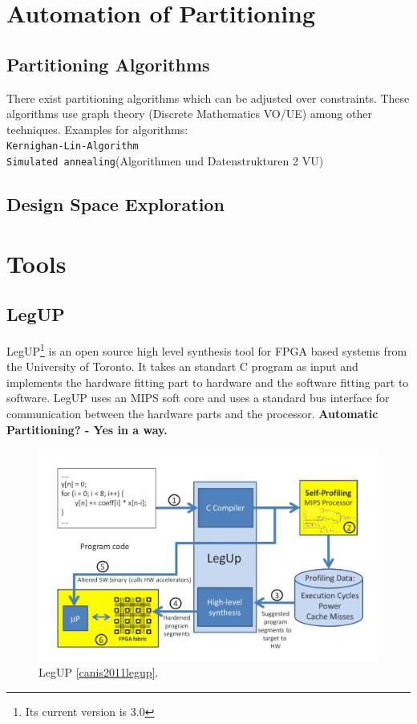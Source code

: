 \documentclass{article}
\begin{document}
	\section{Automation of Partitioning}
	  
	  \subsection{Partitioning Algorithms}
	    There exist partitioning algorithms which can be adjusted over constraints.
	    These algorithms use graph theory (Discrete Mathematics VO/UE) among other techniques.
	    Examples for algorithms: \\
	     \texttt{Kernighan-Lin-Algorithm}\\
	     \texttt{Simulated annealing}(Algorithmen und Datenstrukturen 2 VU)
	     
	  \subsection{Design Space Exploration}
	    
	  
	\section{Tools}	  
	  \subsection{LegUP}
	  LegUP\footnote{Its current version is 3.0} is an open source high level synthesis tool for FPGA based systems from the University of Toronto. 
	  It takes an standart C program as input and implements the hardware fitting part to hardware and the software fitting part to software.
	  LegUP uses an MIPS soft core and uses a standard bus interface for communication between the hardware parts and the processor.  
	  \textbf{Automatic Partitioning? - Yes in a way.}
	  
	    \begin{figure}[hp]
	      \centering
	      \includegraphics[scale=0.2]{../pictures/legup.pdf}
	      \caption{LegUP \ref{canis2011legup}.}
	      \label{fig:legup}
	    \end{figure}
	  
\end{document}
